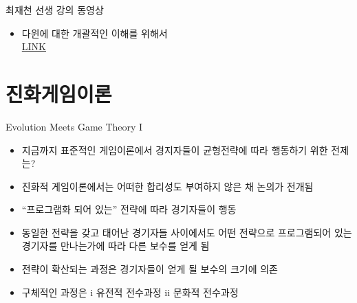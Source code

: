 \documentclass[final]{beamer}
\begin{document}
\begin{frame}[t]{최재천 선생 강의 동영상}
	\begin{itemize}
		\item 다윈에 대한 개괄적인 이해를 위해서 \\
		\href{http://www.youtube.com/watch?v=hUSElnxxzF0}{LINK}
	\end{itemize}

\end{frame}


\section{진화게임이론} %
\label{sec:Evolutionary_Game_Theory}

\begin{frame}[t]{Evolution Meets Game Theory I}
	\begin{itemize}
		\item 지금까지 표준적인 게임이론에서 경지자들이 균형전략에 따라 행동하기 위한 전제는?
		\item 진화적 게임이론에서는 어떠한 합리성도 부여하지 않은 채 논의가 전개됨
		\item “프로그램화 되어 있는” 전략에 따라 경기자들이 행동  
		\item 동일한 전략을 갖고 태어난 경기자들 사이에서도 어떤 전략으로 프로그램되어 있는 경기자를 만나는가에 따라 다른 보수를 얻게 됨
		\item 전략이 확산되는 과정은 경기자들이 얻게 될 보수의 크기에 의존
		\item 구체적인 과정은 i 유전적 전수과정 ii 문화적 전수과정
	\end{itemize}
\end{frame}
\end{document}
